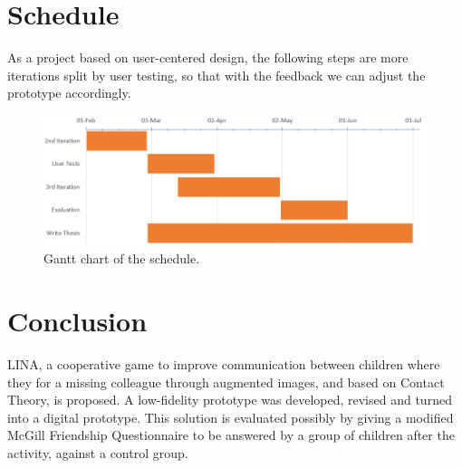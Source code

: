 \documentclass[runningheads]{llncs}
\begin{document}
\section{Schedule}
\par As a project based on user-centered design, the following steps are more iterations split by user testing, so that with the feedback we can adjust the prototype accordingly.   
\begin{figure}
    \centering
    \includegraphics[scale = 0.4]{gantt.png}
    \caption{Gantt chart of the schedule.}
    \label{fig:gantt}
\end{figure}

\section{Conclusion} 
\par LINA, a cooperative game to improve communication between  children where they for a missing colleague through augmented images, and based on Contact Theory, is proposed. A low-fidelity prototype was developed, revised and turned into a digital prototype. This solution is evaluated possibly by giving a modified McGill Friendship Questionnaire to be answered by a group of children after the activity, against a control group. 
\end{document}
